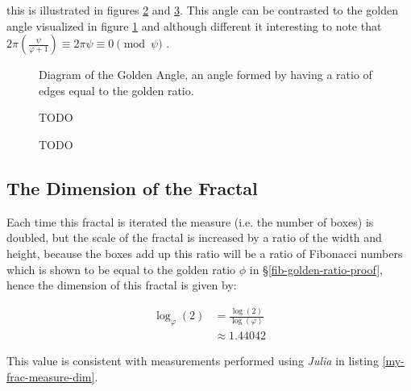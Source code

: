 \documentclass[a4paper,11pt,twoside]{article}
\begin{document}
this is illustrated in figures \ref{My-Frac-ink-blue} and \ref{My-Frac-ink-fade}. This angle can be contrasted to the golden angle visualized in figure \ref{My-Frac-gold-angle} and although different it interesting to note that \(2 \pi\left( \frac{\psi}{\varphi+1}\right) \equiv 2 \pi \psi \equiv 0 \pmod \psi\)
.


\begin{figure}
\centering

\caption{\label{My-Frac-gold-angle}Diagram of the Golden Angle, an angle formed by having a ratio of edges equal to the golden ratio.}
\end{figure}


\begin{figure}[htbp]
\centering

\caption{\label{My-Frac-ink-blue}TODO}
\end{figure}


\begin{figure}[htbp]
\centering

\caption{\label{My-Frac-ink-fade}TODO}
\end{figure}


\subsection{The Dimension of the Fractal}
\label{sec:org11dded8}
Each time this fractal is iterated the measure (i.e. the number of boxes) is doubled, but the scale of the fractal is increased by a ratio of the width and height, because the boxes add up this ratio will be a ratio of Fibonacci numbers which is shown to be equal to the golden ratio \(\phi\) in \S \ref{fib-golden-ratio-proof}, hence the dimension of this fractal is given by:

\begin{align}
\log_{\varphi}\left(2\right) &= \frac{\log (2)}{\log (\varphi)} \\
&\approx 1.44042
\end{align}

This value is consistent with measurements performed using \emph{Julia} in listing \ref{my-frac-measure-dim}.
\end{document}
